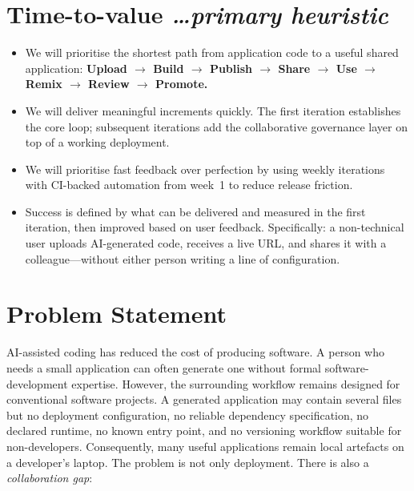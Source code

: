 \documentclass[11pt,a4paper]{article}
\newcommand{\BvrHint}[1]{%
{\normalfont\normalsize\itshape\hfill #1}}
\begin{document}
\section{Time-to-value %
\BvrHint{\ldots primary heuristic}}
\begin{itemize}[leftmargin=0.7cm]
  \item We will prioritise the shortest path from application code to a useful shared
    application: \textbf{Upload $\to$ Build $\to$ Publish $\to$ Share $\to$ Use
    $\to$ Remix $\to$ Review $\to$ Promote.}
  \item We will deliver meaningful increments quickly. The first iteration establishes
    the core loop; subsequent iterations add the collaborative governance layer on top
    of a working deployment.
  \item We will prioritise fast feedback over perfection by using weekly iterations
    with CI-backed automation from week~1 to reduce release friction.
  \item Success is defined by what can be delivered and measured in the first iteration,
    then improved based on user feedback. Specifically: a non-technical user uploads
    AI-generated code, receives a live URL, and shares it with a colleague---without
    either person writing a line of configuration.
\end{itemize}

\section{Problem Statement}

AI-assisted coding has reduced the cost of producing software. A person who needs a small
application can often generate one without formal software-development expertise. However,
the surrounding workflow remains designed for conventional software projects. A generated
application may contain several files but no deployment configuration, no reliable
dependency specification, no declared runtime, no known entry point, and no versioning
workflow suitable for non-developers. Consequently, many useful applications remain local
artefacts on a developer's laptop. The problem is not only deployment. There is also a
\emph{collaboration gap}:
\end{document}
